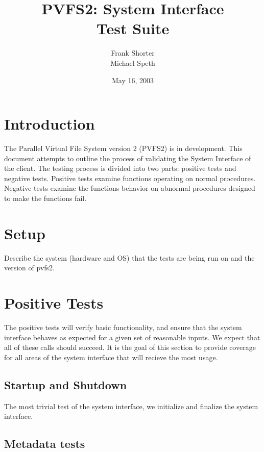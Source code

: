 \documentclass[12pt]{article} %
\title{PVFS2: System Interface\\ Test Suite}
\author{Frank Shorter \\ Michael Speth}
\date{May 16, 2003}
\begin{document}
\maketitle

\section{Introduction}
The Parallel Virtual File System version 2 (PVFS2) is in development.  This document attempts to outline the process of validating the System Interface of the client.  The testing process is divided into two parts: positive tests and negative tests.  Positive tests examine functions operating on normal procedures.  Negative tests examine the functions behavior on abnormal procedures designed to make the functions fail. 

\section{Setup}
\label{setupL}
Describe the system (hardware and OS) that the tests are being run on and the version of pvfs2.

\section{Positive Tests}

The positive tests will verify basic functionality, and ensure that the system interface behaves as expected for a given set of reasonable inputs.  We expect that all of these calls should succeed.  It is the goal of this section to provide coverage for all areas of the system interface that will recieve the most usage.

\subsection{Startup and Shutdown}
The most trivial test of the system interface, we initialize and finalize the system interface.

\subsection{Metadata tests}
\end{document}
